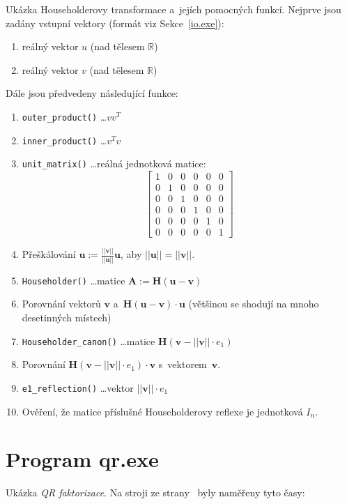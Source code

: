 \documentclass[11pt,a4paper]{article}
\newcommand{\V}{\mathbf{v}}
\newcommand{\U}{\mathbf{u}}
\newcommand{\h}{\mathbf{H}}
\newcommand{\A}{\mathbf{A}}
\theoremstyle{remark}
\begin{document}
Ukázka Householderovy transformace \cite{householder} a~jejích pomocných
funkcí.
Nejprve jsou zadány vstupní vektory (formát viz Sekce~\ref{io.exe}\thinspace):
\begin{enumerate}
\item reálný vektor $u$ (nad tělesem $\mathbb{R}$)
\item reálný vektor $v$ (nad tělesem $\mathbb{R}$)
\end{enumerate}
Dále jsou předvedeny následující funkce:
\begin{enumerate}
\item \verb~outer_product()~ \ldots $vv^T$
\item \verb~inner_product()~ \ldots $v^Tv$
\item \verb~unit_matrix()~ \ldots reálná jednotková matice:
\[
  \begin{bmatrix}
    1 & 0 & 0 & 0 & 0 & 0 \\
    0 & 1 & 0 & 0 & 0 & 0 \\
    0 & 0 & 1 & 0 & 0 & 0 \\
    0 & 0 & 0 & 1 & 0 & 0 \\
    0 & 0 & 0 & 0 & 1 & 0 \\
    0 & 0 & 0 & 0 & 0 & 1
  \end{bmatrix}
\]
\item Přeškálování $\U := \frac{||\V||}{||\U||} \U$, aby $||\U|| = ||\V||$.
\item \verb~Householder()~ \ldots matice $\A := \h(\U - \V)$
\item Porovnání vektorů $\V$ a~$\h(\U - \V) \cdot \U$ (většinou se shodují na
  mnoho desetinných místech)
\item \verb~Householder_canon()~ \ldots matice $\h(\V - ||\V|| \cdot e_1)$
\item Porovnání $\h(\V - ||\V|| \cdot e_1) \cdot \V$ s~vektorem~$\V$.
\item \verb~e1_reflection()~ \ldots vektor $||\V|| \cdot e_1$
\item Ověření, že matice příslušné Householderovy reflexe je jednotková $I_n$.
\end{enumerate}

\section{Program qr.exe}

Ukázka \emph{QR faktorizace\/}.
Na stroji ze strany~\pageref{tab:pc} byly naměřeny tyto
časy:
\end{document}
